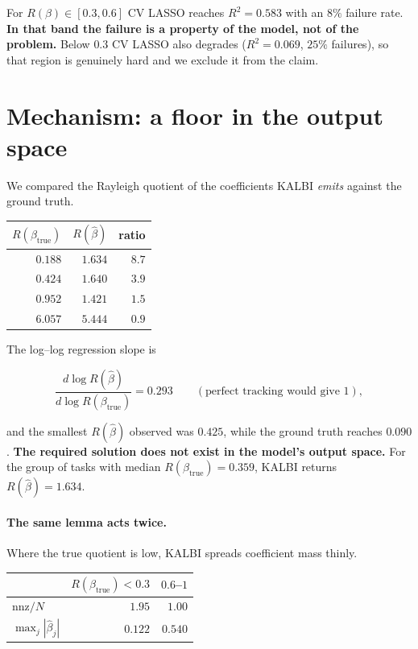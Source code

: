 \documentclass[11pt]{article}
\newcommand{\Rq}{R(\beta)}
\newcommand{\bhat}{\hat{\beta}}
\newcommand{\Rtrue}{R(\beta_{\mathrm{true}})}
\begin{document}
For $\Rq \in [0.3, 0.6]$ CV LASSO reaches $R^2 = 0.583$ with an $8\%$ failure
rate. \textbf{In that band the failure is a property of the model, not of the
problem.} Below $0.3$ CV LASSO also degrades ($R^2 = 0.069$, $25\%$
failures), so that region is genuinely hard and we exclude it from the claim.

\section{Mechanism: a floor in the output space}

We compared the Rayleigh quotient of the coefficients KALBI \emph{emits}
against the ground truth.

\begin{table}[h]
\centering
\begin{tabular}{@{}rrr@{}}
\toprule
$\Rtrue$ & $R(\bhat)$ & ratio \\
\midrule
$0.188$ & $1.634$ & $8.7$ \\
$0.424$ & $1.640$ & $3.9$ \\
$0.952$ & $1.421$ & $1.5$ \\
$6.057$ & $5.444$ & $0.9$ \\
\bottomrule
\end{tabular}
\end{table}

The log--log regression slope is

\begin{equation}
\frac{d \log R(\bhat)}{d \log \Rtrue} = 0.293
\qquad (\text{perfect tracking would give } 1),
\end{equation}

and the smallest $R(\bhat)$ observed was $0.425$, while the ground truth
reaches $0.090$. \textbf{The required solution does not exist in the model's
output space.} For the group of tasks with median $\Rtrue = 0.359$, KALBI
returns $R(\bhat) = 1.634$.

\paragraph{The same lemma acts twice.}
Where the true quotient is low, KALBI spreads coefficient mass thinly.

\begin{table}[h]
\centering
\begin{tabular}{@{}lrr@{}}
\toprule
 & $\Rtrue < 0.3$ & $0.6$--$1$ \\
\midrule
$\mathrm{nnz}/N$   & $1.95$ & $1.00$ \\
$\max_j|\bhat_j|$  & $0.122$ & $0.540$ \\
\bottomrule
\end{tabular}
\end{table}
\end{document}
